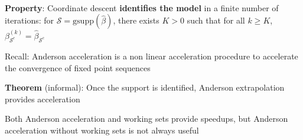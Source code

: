 \documentclass[english,final,t]{beamer}
\newcommand{\cS}{\mathcal{S}}
\begin{document}
\begin{frame}{}
\begin{columns}[t]
\begin{column}{.3\linewidth}
\begin{block}{\textbf{\color{malgared}{\# 2 Support Identification}}}
		 \vspace{0.5em}

		\textbf{\color{malgared}Property}:  Coordinate descent \textbf{identifies the model} in a finite number of iterations: for $\cS = \mathrm{gsupp}(\hat \beta)$, there exists $K>0$ such that for all $k\geq K$, $\beta_{\cS^c}^{(k)} = \hat \beta_{\cS^c}$
		\end{block}
	\begin{block}{\textbf{\color{malgared}{\# 3 Anderson Acceleration}}}

		{\color{malgared}Recall}: Anderson acceleration is a non linear acceleration procedure to accelerate the convergence of fixed point sequences

		\textbf{\color{malgared}Theorem} (informal): Once the support is identified, Anderson extrapolation provides acceleration

		\begin{center}
		\end{center}

		Both Anderson acceleration and working sets provide speedups, but
		Anderson acceleration without working sets is not always useful


\end{block}
\end{column}
\end{columns}
\end{frame}
\end{document}
